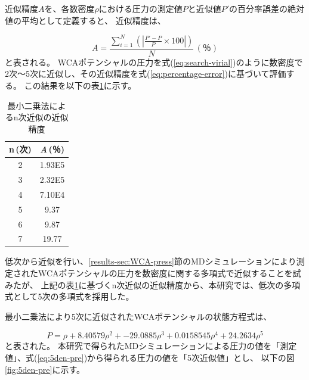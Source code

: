 \documentclass[titlepage]{jsreport}
\begin{document}
{{{近似精度$A$を、各数密度$\rho$における圧力の測定値$P$と近似値$P'$の百分率誤差の絶対値の平均として定義すると、
近似精度は、

\large
\begin{equation}
    A=\frac{\sum_{i=1}^N\left(|\frac{P'-P}{P}\times100|\right)}{N}\,(％)\label{eq:percentage-error}
\end{equation}
\normalsize
と表される。
WCAポテンシャルの圧力を式(\ref{eq:search-virial})のように数密度で2次〜5次に近似し、その近似精度を式(\ref{eq:percentage-error})に基づいて評価する。
この結果を以下の表\ref{table:approximation-accuracy}に示す。

\begin{table}[htbp]
    \begin{center}
        \caption{最小二乗法によるn次近似の近似精度}
            \begin{tabular}{c c}
               
                    n\,(次) & {\it{A}}\,(％) \\ \hline\hline
                    2 & 1.93E5 \\ 
                    3 & 2.32E5 \\ 
                    4 & 7.10E4\\ 
                    5 & 9.37\\ 
                    6 & 9.87 \\ 
                    7 & 19.77 \\ \hline
                
            \end{tabular}
    \end{center}
    \label{table:approximation-accuracy}
\end{table}

低次から近似を行い、\ref{results-sec:WCA-press}節のMDシミュレーションにより測定されたWCAポテンシャルの圧力を数密度に関する多項式で近似することを試みたが、
上記の表\ref{table:approximation-accuracy}に基づくn次近似の近似精度から、本研究では、低次の多項式として5次の多項式を採用した。

最小二乗法により5次に近似されたWCAポテンシャルの状態方程式は、

\large
\begin{equation}
    P=\rho+8.40579\rho^2+-29.0885\rho^3+0.0158545\rho^4+24.2634\rho^5 \label{eq:5den-pre}
\end{equation}
\normalsize
と表された。
本研究で得られたMDシミュレーションによる圧力の値を「測定値」、式(\ref{eq:5den-pre})から得られる圧力の値を「5次近似値」とし、
以下の図\ref{fig:5den-pre}に示す。

}}}
\end{document}
